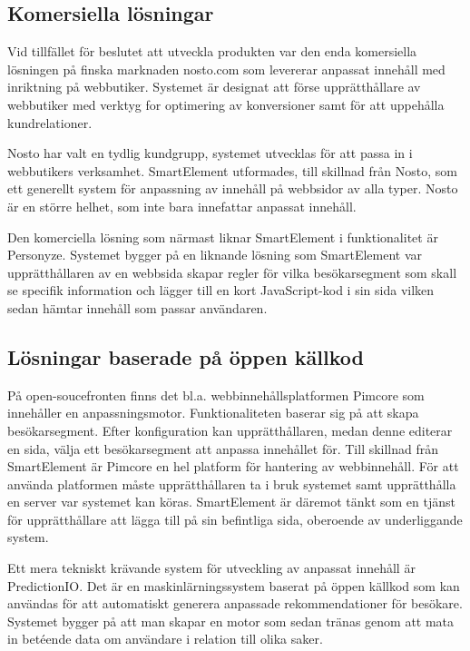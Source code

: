 \subsection{Komersiella lösningar}

Vid tillfället för beslutet att utveckla produkten var den enda komersiella lösningen på finska marknaden nosto.com som levererar anpassat innehåll med inriktning på webbutiker. Systemet är designat att förse upprätthållare av webbutiker med verktyg for optimering av konversioner samt för att uppehålla kundrelationer. \citep{nosto}

Nosto har valt en tydlig kundgrupp, systemet utvecklas för att passa in i webbutikers verksamhet. SmartElement utformades, till skillnad från Nosto, som ett generellt system för anpassning av innehåll på webbsidor av alla typer. Nosto är en större helhet, som inte bara innefattar anpassat innehåll.

Den komerciella lösning som närmast liknar SmartElement i funktionalitet är Personyze. Systemet bygger på en liknande lösning som SmartElement var upprätthållaren av en webbsida skapar regler för vilka besökarsegment som skall se specifik information och lägger till en kort JavaScript-kod i sin sida vilken sedan hämtar innehåll som passar användaren. \citep{personyze}

\subsection{Lösningar baserade på öppen källkod}

På open-soucefronten finns det bl.a. webbinnehållsplatformen Pimcore som innehåller en anpassningsmotor. Funktionaliteten baserar sig på att skapa besökarsegment. Efter konfiguration kan upprätthållaren, medan denne editerar en sida, välja ett besökarsegment att anpassa innehållet för. \citep{pimcore}
Till skillnad från SmartElement är Pimcore en hel platform för hantering av webbinnehåll. För att använda platformen måste upprätthållaren ta i bruk systemet samt upprätthålla en server var systemet kan köras. SmartElement är däremot tänkt som en tjänst för upprätthållare att lägga till på sin befintliga sida, oberoende av underliggande system.

Ett mera tekniskt krävande system för utveckling av anpassat innehåll är PredictionIO. Det är en maskinlärningssystem baserat på öppen källkod som kan användas för att automatiskt generera anpassade rekommendationer för besökare. Systemet bygger på att man skapar en motor som sedan tränas genom att mata in betéende data om användare i relation till olika saker. \citep{predicionioconcepts}


